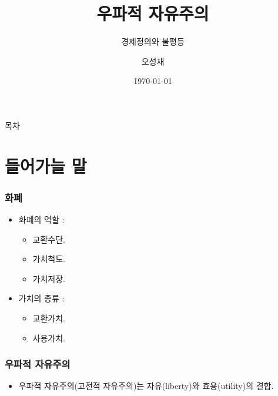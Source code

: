 \documentclass[aspectratio=169,xcolor=dvipsnames,handout]{beamer}
\title[우파적 자유주의]{우파적 자유주의} %
\subtitle{경제정의와 불평등}
\author[오성재]{오성재}
\institute[HNU] %
{
    한남대학교 \\
    탈메이지 교양학부 \\
}
\date{\today} %
\begin{document}
\begin{frame}
    \titlepage
\end{frame}

\begin{frame}{목차}
    \tableofcontents
\end{frame}

\section{들어가늘 말}

\begin{frame}[<+->]
\frametitle{화폐}
    \begin{itemize}
        \item 화폐의 역할 : 
        \begin{itemize}
            \item 교환수단.
            \item 가치척도.
            \item 가치저장.
        \end{itemize}
        \item 가치의 종류 : 
        \begin{itemize}
            \item 교환가치.
            \item 사용가치.
        \end{itemize}
        
    \end{itemize}
\end{frame}

\begin{frame}[<+->]
\frametitle{우파적 자유주의}
    \begin{itemize}
        \item 우파적 자유주의(고전적 자유주의)는 자유(liberty)와 효용(utility)의 결합.
    \end{itemize}
\end{frame}
\end{document}
